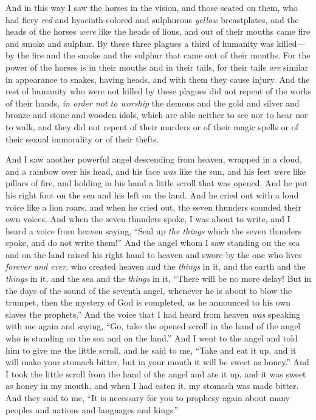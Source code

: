 \begin{biblechapter}
\verse And in this way I saw the horses in the vision, and those seated on them, who had fiery \textit{red} and hyacinth-colored and sulphurous \textit{yellow} breastplates, and the heads of the horses \textit{were} like the heads of lions, and out of their mouths came fire and smoke and sulphur.
\verse By these three plagues a third of humanity was killed—by the fire and the smoke and the sulphur that came out of their mouths.
\verse For the power of the horses is in their mouths and in their tails, for their tails \textit{are} similar in appearance to snakes, having heads, and with them they cause injury.
\verse And the rest of humanity who were not killed by these plagues did not repent of the works of their hands, \textit{in order not to worship} the demons and the gold and silver and bronze and stone and wooden idols, which are able neither to see nor to hear nor to walk,
\verse and they did not repent of their murders or of their magic spells or of their sexual immorality or of their thefts.
\end{biblechapter}

\begin{biblechapter} %
 And I saw another powerful angel descending from heaven, wrapped in a cloud, and a rainbow over his head, and his face \textit{was} like the sun, and his feet \textit{were} like pillars of fire,
\verse and holding in his hand a little scroll that was opened. And he put his right foot on the sea and his left on the land.
\verse And he cried out with a loud voice like a lion roars, and when he cried out, the seven thunders sounded their own voices.
\verse And when the seven thunders spoke, I was about to write, and I heard a voice from heaven saying, “Seal up \textit{the things} which the seven thunders spoke, and do not write them!”
\verse And the angel whom I saw standing on the sea and on the land raised his right hand to heaven
\verse and swore by the one who lives \textit{forever and ever}, who created heaven and the \textit{things} in it, and the earth and the \textit{things} in it, and the sea and the \textit{things} in it, “There will be no more delay!
\verse But in the days of the sound of the seventh angel, whenever he is about to blow the trumpet, then the mystery of God is completed, as he announced to his own slaves the prophets.”
\verse And the voice that I had heard from heaven \textit{was} speaking with me again and saying, “Go, take the opened scroll in the hand of the angel who is standing on the sea and on the land.”
\verse And I went to the angel and told him to give me the little scroll, and he said to me, “Take and eat it up, and it will make your stomach bitter, but in your mouth it will be sweet as honey.”
\verse And I took the little scroll from the hand of the angel and ate it up, and it was sweet as honey in my mouth, and when I had eaten it, my stomach was made bitter.
\verse And they said to me, “It is necessary for you to prophesy again about many peoples and nations and languages and kings.”
\end{biblechapter}

